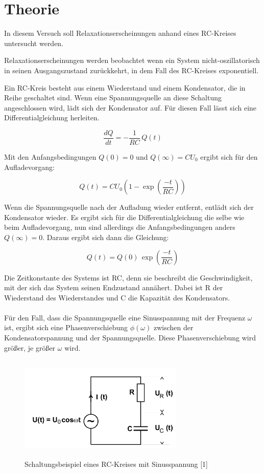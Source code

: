 \section{Theorie}

In diesem Versuch soll Relaxationserscheinungen anhand eines RC-Kreises untersucht
werden.

Relaxationserscheinungen werden beobachtet wenn ein System nicht-oszillatorisch
in seinen Ausgangszustand zurückkehrt, in dem Fall des RC-Kreises exponentiell.

Ein RC-Kreis besteht aus einem Wiederstand und einem Kondensator, die in Reihe
geschaltet sind. Wenn eine Spannungsquelle an diese Schaltung angeschlossen wird,
lädt sich der Kondensator auf. Für diesen Fall lässt sich eine Differentialgleichung
herleiten.

\begin{equation}
  \frac{dQ}{dt} = -\frac{1}{RC}\, Q(t)
\end{equation}

Mit den Anfangsbedingungen $Q(0)=0$ und $Q(\infty)= CU_0$ ergibt sich für den Aufladevorgang:

\begin{equation}
  Q(t) = CU_0 \left(1 - \exp\left(\frac{-t}{RC}\right)\right)
\end{equation}

Wenn die Spannungsquelle nach der Aufladung wieder entfernt, entlädt sich der Kondensator
wieder. Es ergibt sich für die Differentialgleichung die selbe wie beim Aufladevorgang,
nun sind allerdings die Anfangsbedingungen anders $Q(\infty) = 0$. Daraus ergibt sich dann
die Gleichung:

\begin{equation}
  Q(t) = Q(0)\, \exp\left(\frac{-t}{RC}\right)
\end{equation}

Die Zeitkonstante des Systems ist RC, denn sie beschreibt die Geschwindigkeit, mit
der sich das System seinen Endzustand annähert. Dabei ist R der Wiederstand des Wiederstandes
und C die Kapazität des Kondensators.\\\\

Für den Fall, dass die Spannungsquelle eine Sinusspannung mit der Frequenz $\omega$
ist, ergibt sich eine Phasenverschiebung $\phi(\omega)$ zwischen der Kondensatorspannung
und der Spannungsquelle. Diese Phasenverschiebung wird größer, je größer $\omega$ wird.

\begin{figure}
  \centering
  \includegraphics[height=5cm, width=0.7\textwidth]{Schaltungsbeispiel.png}
  \caption{Schaltungsbeispiel eines RC-Kreises mit Sinusspannung [1]}
\end{figure}

